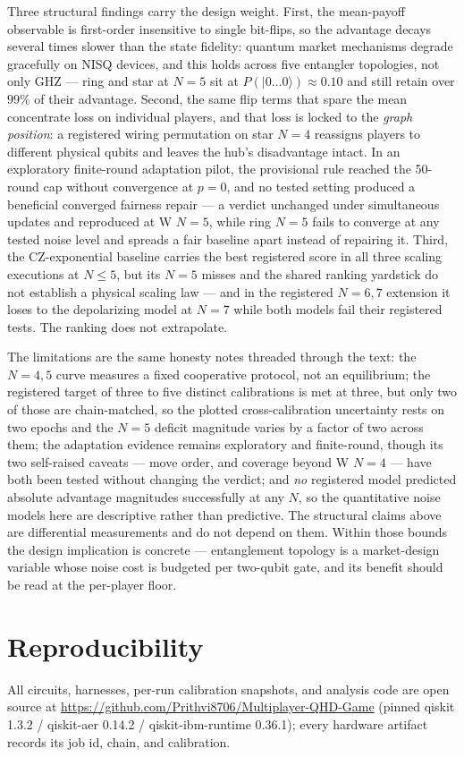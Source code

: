 \documentclass[conference]{IEEEtran}
\newcommand{\ket}[1]{\ensuremath{|#1\rangle}}
\begin{document}
Three structural findings carry the design weight. First, the mean-payoff
observable is first-order insensitive to single bit-flips, so the advantage
decays several times slower than the state fidelity: quantum market
mechanisms degrade gracefully on NISQ devices, and this holds across five
entangler topologies, not only GHZ --- ring and star at $N{=}5$ sit at
$P(\ket{0\ldots0})\approx0.10$ and still retain over $99\%$ of their advantage.
Second, the same flip terms
that spare the mean concentrate loss on individual players, and that loss is
locked to the \emph{graph position}: a registered wiring permutation on star
$N{=}4$ reassigns players to different physical qubits and leaves the hub's
disadvantage intact. In an exploratory
finite-round adaptation pilot, the provisional rule reached the 50-round cap
without convergence at $p{=}0$, and no tested setting produced a beneficial
converged fairness repair --- a verdict unchanged under simultaneous updates and
reproduced at W $N{=}5$, while ring $N{=}5$ fails to converge at any tested
noise level and spreads a fair baseline apart instead of repairing it.
Third, the CZ-exponential baseline carries the best
registered score in all three
scaling executions at $N\le5$, but its $N{=}5$ misses and the shared ranking
yardstick do not establish a physical scaling law --- and in the registered
$N{=}6,7$ extension it loses to the depolarizing model at $N{=}7$ while both
models fail their registered tests. The ranking does not extrapolate.

The limitations are the same honesty notes threaded through the text: the
$N{=}4,5$ curve measures a fixed cooperative protocol, not an equilibrium;
the registered target of three to five distinct calibrations is met at three,
but only two of those are chain-matched, so the plotted cross-calibration
uncertainty rests on two epochs and the $N{=}5$ deficit magnitude varies by a
factor of two across them; the adaptation evidence remains exploratory and
finite-round, though its two self-raised caveats --- move order, and coverage
beyond W $N{=}4$ --- have both been tested without changing the verdict; and
\emph{no} registered model predicted absolute advantage magnitudes
successfully at any $N$, so the quantitative noise models here are descriptive
rather than predictive. The structural claims above are differential
measurements and do not depend on them. Within those
bounds the design implication is concrete ---
entanglement topology is a market-design variable whose noise cost is budgeted per
two-qubit gate, and its benefit should be read at the per-player floor.

\section*{Reproducibility}
All circuits, harnesses, per-run calibration snapshots, and analysis code are
open source at \url{https://github.com/Prithvi8706/Multiplayer-QHD-Game}
(pinned qiskit 1.3.2 / qiskit-aer 0.14.2 / qiskit-ibm-runtime 0.36.1); every
hardware artifact records its job id, chain, and calibration.



\end{document}
